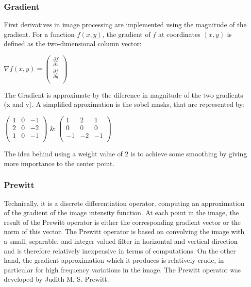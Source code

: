 \documentclass[a4paper]{article}
\begin{document}
\subsubsection{Gradient}
First derivatives in image processing are implemented using the magnitude of
the gradient. For a function $f(x, y)$, the gradient of $f$ at coordinates $(x, y)$ is defined as the two-dimensional column vector: \\
\begin{center}
\begin{math}
 \nabla f(x,y) =
 \begin{pmatrix} 
  \frac{\partial f}{\partial x} \\
  \frac{\partial f}{\partial y} \\
  \end{pmatrix}
\end{math}
\end{center}
The Gradient is approximate by the diference in magnitude of the two gradients (x and y). A simplified aproximation is the sobel masks, that are represented by:
\begin{center}

\begin{math}
   \begin{pmatrix} 
   1 & 0 & -1 \\ 
   2 & 0 & -2 \\
   1 & 0 & -1 \\ 
   \end{pmatrix}
\end{math}  \& 
\begin{math}
   \begin{pmatrix} 
   1 & 2 & 1 \\ 
   0 & 0 & 0 \\
   -1 & -2 & -1 \\ 
   \end{pmatrix}
\end{math}\\
\end{center}
The idea behind using a weight value of 2 is to achieve some smoothing by giving more importance to the center point.

\subsubsection{Prewitt}
Technically, it is a discrete differentiation operator, computing an approximation of the gradient of the image intensity function. At each point in the image, the result of the Prewitt operator is either the corresponding gradient vector or the norm of this vector. The Prewitt operator is based on convolving the image with a small, separable, and integer valued filter in horizontal and vertical direction and is therefore relatively inexpensive in terms of computations. On the other hand, the gradient approximation which it produces is relatively crude, in particular for high frequency variations in the image. The Prewitt operator was developed by Judith M. S. Prewitt.\\
\end{document}
